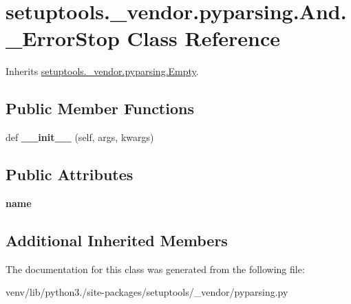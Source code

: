 \hypertarget{classsetuptools_1_1__vendor_1_1pyparsing_1_1_and_1_1___error_stop}{}\section{setuptools.\+\_\+vendor.\+pyparsing.\+And.\+\_\+\+Error\+Stop Class Reference}
\label{classsetuptools_1_1__vendor_1_1pyparsing_1_1_and_1_1___error_stop}


Inherits \hyperlink{classsetuptools_1_1__vendor_1_1pyparsing_1_1_empty}{setuptools.\+\_\+vendor.\+pyparsing.\+Empty}.

\subsection*{Public Member Functions}
\begin{DoxyCompactItemize}
\item 
\mbox{\label{classsetuptools_1_1__vendor_1_1pyparsing_1_1_and_1_1___error_stop_a4fba4b1a6ac5afe7ebdd7b92f3bac3e1}} 
def {\bfseries \+\_\+\+\_\+init\+\_\+\+\_\+} (self, args, kwargs)
\end{DoxyCompactItemize}
\subsection*{Public Attributes}
\begin{DoxyCompactItemize}
\item 
\mbox{\label{classsetuptools_1_1__vendor_1_1pyparsing_1_1_and_1_1___error_stop_a98e0d52fb28a2b8ba0fec67b2148a2ef}} 
{\bfseries name}
\end{DoxyCompactItemize}
\subsection*{Additional Inherited Members}


The documentation for this class was generated from the following file\+:\begin{DoxyCompactItemize}
\item 
venv/lib/python3./site-\/packages/setuptools/\+\_\+vendor/pyparsing.\+py\end{DoxyCompactItemize}
